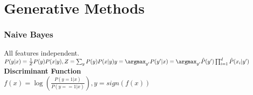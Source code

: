 \section{Generative Methods}

\subsubsection*{Naive Bayes}
All features independent.\\
$
P(y|x) = \frac{1}{Z} P(y) P(x|y), Z = \sum_{y} P(y) P(x|y) \\
y = \argmax_{y'} P(y'|x) = \argmax_{y'} \hat{P}(y') \prod_{i=1}^{d} \hat{P}(x_i|y')
$ \\
\textbf{Discriminant Function}\\
$
f(x) = \log(\frac{P(y=1|x)}{P(y==1|x)}), y=sign(f(x))
$

%

